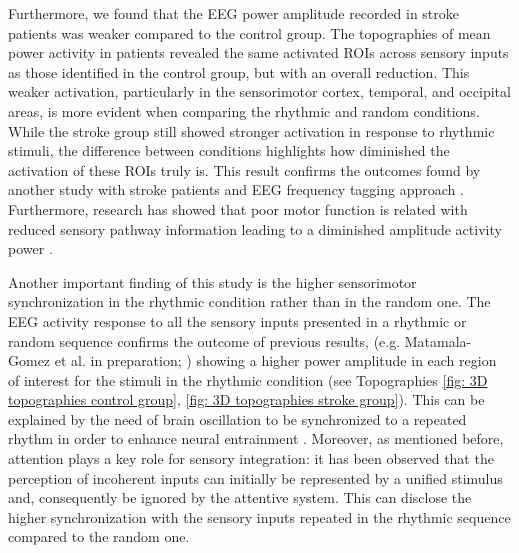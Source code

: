 Furthermore, we found that the EEG power amplitude recorded in stroke patients was weaker compared to the control group. The topographies of mean power activity in patients revealed the same activated ROIs across sensory inputs as those identified in the control group, but with an overall reduction. This weaker activation, particularly in the sensorimotor cortex, temporal, and occipital areas, is more evident when comparing the rhythmic and random conditions. While the stroke group still showed stronger activation in response to rhythmic stimuli, the difference between conditions highlights how diminished the activation of these ROIs truly is. This result confirms the outcomes found by another study with stroke patients and EEG frequency tagging approach \parencite{Nozaradan_2017}. Furthermore, research has showed that poor motor function is related with reduced sensory pathway information leading to a diminished amplitude activity power \parencite{Campfens_2015}. 

Another important finding of this study is the higher sensorimotor synchronization in the rhythmic condition rather than in the random one. The EEG activity response to all the sensory inputs presented in a rhythmic or random sequence confirms the outcome of previous results, (e.g. Matamala-Gomez et al. in preparation; \cite{Haegens_2018}) showing a higher power amplitude in each region of interest for the stimuli in the rhythmic condition (see Topographies \ref{fig: 3D topographies control group}, \ref{fig: 3D topographies stroke group}). This can be explained by the need of brain oscillation to be synchronized to a repeated rhythm in order to enhance neural entrainment \parencite{Rosso_2023}. 
Moreover, as mentioned before, attention plays a key role for sensory integration: it has been observed that the perception of incoherent inputs can initially be represented by a unified stimulus \parencite{Bergam_1990} and, consequently be ignored by the attentive system. This can disclose the higher synchronization with the sensory inputs repeated in the rhythmic sequence compared to the random one. 

